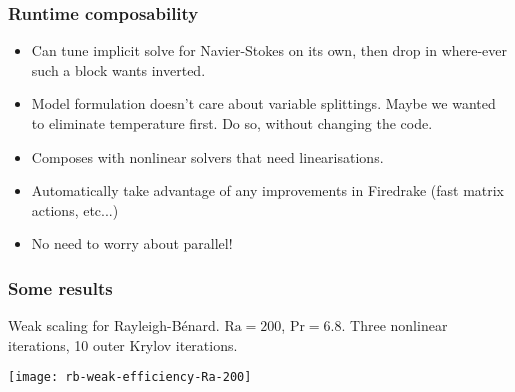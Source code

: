 \documentclass[presentation]{beamer}
\begin{document}
\begin{frame}
  \frametitle{Runtime composability}

  \begin{itemize}
  \item Can tune implicit solve for Navier-Stokes on its own, then
    drop in where-ever such a block wants inverted.

  \item Model formulation doesn't care about variable
    splittings. Maybe we wanted to eliminate temperature first.  Do
    so, without changing the code.

  \item Composes with nonlinear solvers that need linearisations.

  \item Automatically take advantage of any improvements in Firedrake
    (fast matrix actions, etc...)

  \item No need to worry about parallel!
  \end{itemize}
\end{frame}

\begin{frame}
  \frametitle{Some results}
  Weak scaling for Rayleigh-B\'enard.  $\text{Ra} = 200$, $\text{Pr} =
  6.8$.  Three nonlinear iterations, 10 outer Krylov iterations.
  \begin{center}
    \texttt{[image: rb-weak-efficiency-Ra-200]}
  \end{center}
\end{frame}
\end{document}
